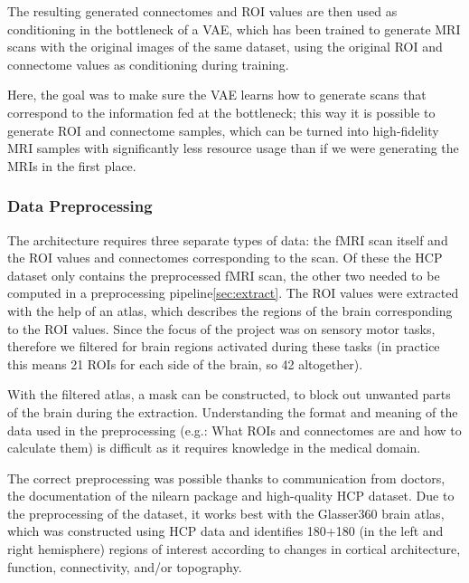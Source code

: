	The resulting generated connectomes and ROI values are then used as conditioning in the bottleneck of a VAE, which has been trained to generate MRI scans with the original images of the same dataset, using the original ROI and connectome values as conditioning during training. 
	
	Here, the goal was to make sure the VAE learns how to generate scans that correspond to the information fed at the bottleneck; this way it is possible to generate ROI and connectome samples, which can be turned into high-fidelity MRI samples with significantly less resource usage than if we were generating the MRIs in the first place.
	
	\subsubsection{Data Preprocessing}
	
	The architecture requires three separate types of data: the fMRI scan itself and the ROI values and connectomes corresponding to the scan. Of these the HCP dataset only contains the preprocessed fMRI scan, the other two needed to be computed in a preprocessing pipeline\ref{sec:extract}. The ROI values were extracted with the help of an atlas, which describes the regions of the brain corresponding to the ROI values. Since the focus of the project was on sensory motor tasks, therefore we filtered for brain regions activated during these tasks (in practice this means 21 ROIs for each side of the brain, so 42 altogether). 
	
	With the filtered atlas, a mask can be constructed, to block out unwanted parts of the brain during the extraction. Understanding the format and meaning of the data used in the preprocessing (e.g.: What ROIs and connectomes are and how to calculate them) is difficult as it requires knowledge in the medical domain. 
	
	The correct preprocessing was possible thanks to communication from doctors, the documentation of the nilearn package and high-quality HCP dataset. Due to the preprocessing of the dataset, it works best with the Glasser360 brain atlas\cite{sporns2005human}, which was constructed using HCP data and identifies 180+180 (in the left and right hemisphere) regions of interest according to changes in cortical architecture, function, connectivity, and/or topography.

